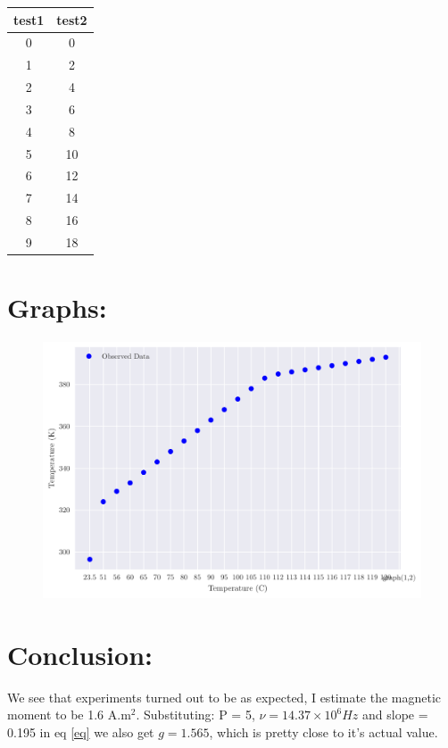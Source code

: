 \documentclass{../_layouts/ieeeconf}
\begin{document}
\begin{table}[H]
    \centering
    \begin{tabular}{@{}cc@{}}
        \toprule
        ﻿test1 & test2 \\
        \midrule
        0 & 0 \\
        1 & 2 \\
        2 & 4 \\
        3 & 6 \\
        4 & 8 \\
        5 & 10 \\
        6 & 12 \\
        7 & 14 \\
        8 & 16 \\
        9 & 18 \\
        \bottomrule
    \end{tabular}
\end{table}
\section{Graphs:}
\begin{figure}[H]
\centering
\includegraphics[width = \columnwidth]{../_assets/Temperature.pdf}
\end{figure}
\section{Conclusion:}
We see that experiments turned out to be as expected, I estimate the
magnetic moment to be 1.6 A.m\(^2\). Substituting: P = 5,
\(\nu = 14.37 \times 10^6 Hz\) and slope = 0.195 in eq \ref{eq} we also
get \(g = 1.565\), which is pretty close to it's actual value.
\end{document}
